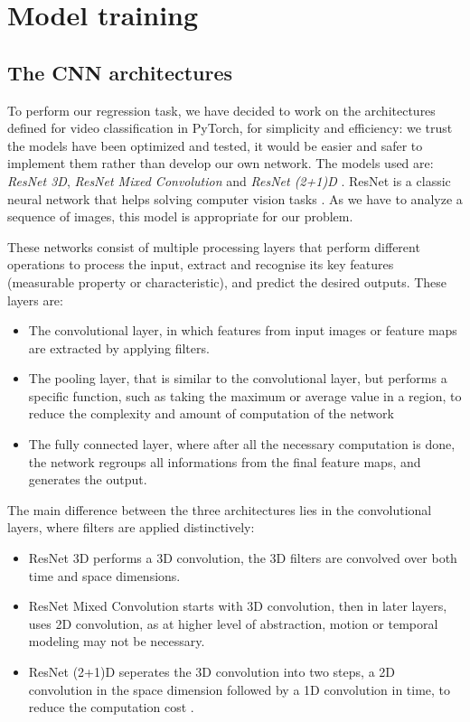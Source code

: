 \documentclass[10pt,conference]{IEEEtran}
\begin{document}
\section{Model training}
 
\subsection{The CNN architectures}
To perform our regression task, we have decided to work on the architectures defined for video classification in PyTorch, for simplicity and efficiency: we trust the models have been optimized and tested, it would be easier and safer to implement them rather than develop our own network. The models used are: \textit{ResNet 3D}, \textit{ResNet Mixed Convolution} and \textit{ResNet (2+1)D} \cite{resnets}. ResNet is a classic neural network that helps solving computer vision tasks \cite{hara3dcnns}. As we have to analyze a sequence of images, this model is appropriate for our problem.\par
These networks consist of multiple processing layers that perform different operations to process the input, extract and recognise its key features (measurable property or characteristic), and predict the desired outputs. These layers are:
\begin{itemize}
  \item The convolutional layer, in which features from input images or feature maps are extracted by applying filters.
  \item The pooling layer, that is similar to the convolutional layer, but performs a specific function, such as taking the maximum or average value in a region, to reduce the complexity and amount of computation of the network 
  \item The fully connected layer, where after all the necessary computation is done, the network regroups all informations from the final feature maps, and generates the output.
\end{itemize}

The main difference between the three architectures lies in the convolutional layers, where filters are applied distinctively:
\begin{itemize}
  \item ResNet 3D performs a 3D convolution, the 3D filters are convolved over both time and space dimensions.
  \item ResNet Mixed Convolution starts with 3D convolution, then in later layers, uses 2D convolution, as at higher level of abstraction, motion or temporal modeling may not be necessary.
  \item ResNet (2+1)D seperates the 3D convolution into two steps, a 2D convolution in the space dimension followed by a 1D convolution in time, to reduce the computation cost \cite{spacetimeconv}.
\end{itemize}
\end{document}
